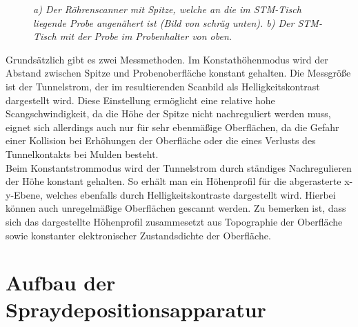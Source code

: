 \begin{figure}[H]
\centering
\sffamily

\caption{\textit{a) Der Röhrenscanner mit Spitze, welche an die im STM-Tisch
liegende Probe angenähert ist (Bild von schräg unten). b) Der STM-Tisch mit der
Probe im Probenhalter von oben.}}
\label{stmaufbau}
\end{figure}

Grundsätzlich gibt es zwei Messmethoden. Im Konstathöhenmodus wird der Abstand zwischen Spitze und
Probenoberfläche konstant gehalten. Die Messgröße ist der Tunnelstrom, der im resultierenden
Scanbild als Helligkeitskontrast dargestellt wird. Diese Einstellung ermöglicht eine relative hohe
Scangschwindigkeit, da die Höhe der Spitze nicht nachreguliert werden muss, eignet sich
allerdings auch nur für sehr ebenmäßige Oberflächen, da die Gefahr einer Kollision bei Erhöhungen
der Oberfläche oder die eines Verlusts des Tunnelkontakts bei Mulden besteht.
\\
Beim Konstantstrommodus wird der Tunnelstrom durch ständiges Nachregulieren der Höhe konstant
gehalten. So erhält man ein Höhenprofil für die abgerasterte x-y-Ebene, welches ebenfalls durch
Helligkeitskontraste dargestellt wird. Hierbei können auch unregelmäßige Oberflächen gescannt
werden. Zu bemerken ist, dass sich das dargestellte Höhenprofil zusammesetzt aus Topographie der
Oberfläche sowie konstanter elektronischer Zustandsdichte der Oberfläche.


\section{Aufbau der Spraydepositionsapparatur}
\FloatBarrier

